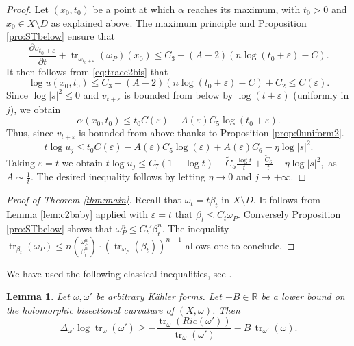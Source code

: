 \documentclass[11pt]{amsart}
\numberwithin{equation}{section}
\newtheorem{lem}[theorem]{Lemma}
\newcommand{\R}{\mathbb R}
\newcommand \e {\varepsilon}
\newcommand{\tr}{\operatorname{tr}}
\begin{document}
\begin{proof}
Let $(x_0, t_0)$ be a point at which $\alpha$ reaches its maximum,
with $t_0>0$ and $x_0 \in X \setminus D$ as explained above.
The maximum principle and Proposition \ref{pro:STbelow} ensure that 
$$ 
\frac{\partial v_{t_0+\e}}{\partial t}  + \tr_{\omega_{t_0+\varepsilon}}(\omega_P)(x_0)\leq C_3-(A-2)(n\log (t_0+\varepsilon)-C). 
$$  
It then follows from \eqref{eq:trace2bis} that
$$
\log u(x_0, t_0) \leq  C_3-(A-2)(n\log (t_0+\varepsilon)-C) +C_2
\leq  C(\varepsilon).
$$ 
Since $\log|s|^2 \leq 0$ and $v_{t+\varepsilon}$ is bounded from below by $ \log (t+\varepsilon) $ (uniformly in $j$),  
we obtain 
$$
\alpha (x_0, t_0)\leq t_0  C(\varepsilon) -A(\varepsilon)C_5 \log (t_0+\varepsilon).
$$
Thus, since $v_{t+\varepsilon}$ is bounded from above thanks to Proposition \ref{prop:0uniform2}.
$$
t\log u_j \leq  t_0 C(\varepsilon)  -A(\varepsilon)C_5 \log (\varepsilon)+A(\varepsilon)C_6 -\eta \log|s|^2.
$$
Taking $\varepsilon=t$ we obtain
$
t\log u_j \leq  C_7 (1-\log t)  -\tilde{C}_5 \frac{\log t}{t}+\frac{\tilde{C}_6}{t} -\eta \log|s|^2,
$
as $A\sim \frac{1}{t}$.
The desired inequality follows  by letting $\eta \to 0$ and $j \rightarrow +\infty$. 
\end{proof}

 
  

 
 
\begin{proof}[Proof of Theorem \ref{thm:main}]
Recall that $\omega_t=t \beta_t$ in $X \setminus D$.
It follows from Lemma \ref{lem:c2baby} applied with $\e=t$ that $\beta_t \leq C_t \omega_P$.
Conversely Proposition \ref{pro:STbelow} shows that $\omega_P^n \leq C_t'  \beta_t^n $.
The inequality
$
\tr_{\beta_t}(\omega_P)
\leq n \left( \frac{\omega_P^n}{\beta_t^n} \right) \cdot \left( \tr_{\omega_P} (\beta_t) \right)^{n-1}
$
allows one to conclude.
\end{proof}

 



 We have used the following classical  inequalities, see \cite{Siu87}.
 
 \begin{lem} \label{lem:Siu}
Let $\omega,\omega'$ be arbitrary K\"ahler forms.
Let $-B \in \R$ be a lower bound on the holomorphic bisectional curvature of $(X,\omega)$. Then
$$
\Delta_{\omega'} \log \tr_{\omega} (\omega') \geq -\frac{\tr_{\omega}(Ric(\omega'))}{\tr_{\omega}(\omega')}
-B \,  \tr_{\omega'}(\omega).
$$
\end{lem}
 
 
\end{document}
